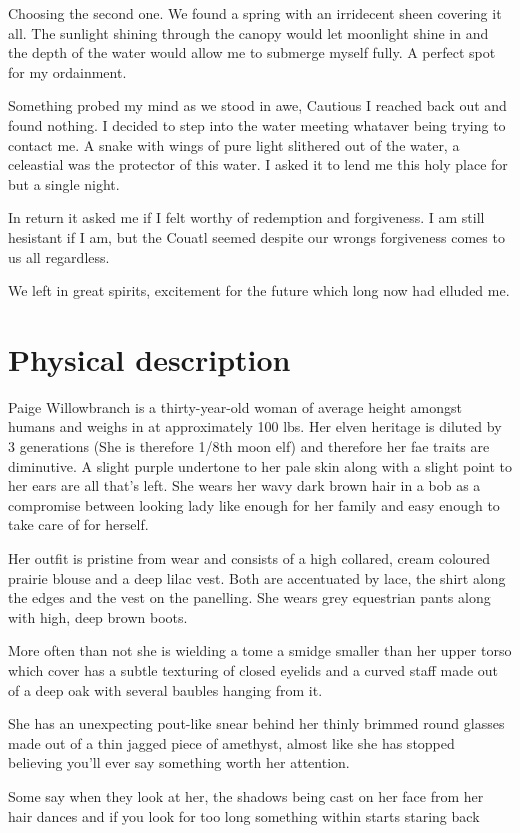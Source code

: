 \documentclass{article}
\begin{document}
Choosing the second one. We found a spring with an irridecent sheen covering it all. The sunlight shining through the canopy would let moonlight shine in and the depth of the water would allow me to submerge myself fully. A perfect spot for my ordainment. 

Something probed my mind as we stood in awe, Cautious I reached back out and found nothing. I decided to step into the water meeting whataver being trying to contact me. A snake with wings of pure light slithered out of the water, a celeastial was the protector of this water. I asked it to lend me this holy place for but a single night. 

In return it asked me if I felt worthy of redemption and forgiveness. I am still hesistant if I am, but the Couatl seemed despite our wrongs forgiveness comes to us all regardless.

We left in great spirits, excitement for the future which long now had elluded me.


\newpage
\section*{Physical description}

Paige Willowbranch is a thirty-year-old woman of average height amongst humans and weighs in at approximately 100 lbs. Her elven heritage is diluted by 3 generations (She is therefore 1/8th moon elf) and therefore her fae traits are diminutive. 
A slight purple undertone to her pale skin along with a slight point to her ears are all that's left. She wears her wavy dark brown hair in a bob as a compromise between looking lady like enough for her family and easy enough to take care of for herself.

Her outfit is pristine from wear and consists of a high collared, cream coloured prairie blouse and a deep lilac vest. Both are accentuated by lace, the shirt along the edges and the vest on the panelling. She wears grey equestrian pants along with high, deep brown boots. 

More often than not she is wielding a tome a smidge smaller than her upper torso which cover has a subtle texturing of closed eyelids and a curved staff made out of a deep oak with several baubles hanging from it. 

She has an unexpecting pout-like snear behind her thinly brimmed round glasses made out of a thin jagged piece of amethyst, almost like she has stopped believing you'll ever say something worth her attention.

Some say when they look at her, the shadows being cast on her face from her hair dances and if you look for too long something within starts staring back
\end{document}
